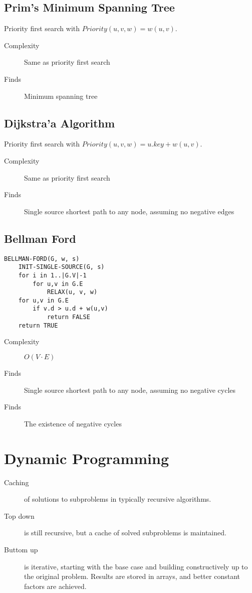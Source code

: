 \documentclass[landscape]{cheat}
\begin{document}
\begin{multicols*}{3}
\subsection{Prim's Minimum Spanning Tree}
Priority first search with $Priority(u, v, w) = w(u, v)$.
\begin{description}
    \item[Complexity] Same as priority first search
    \item[Finds] Minimum spanning tree
\end{description}

\subsection{Dijkstra'a Algorithm}
Priority first search with $Priority(u, v, w) = u.key + w(u, v)$.
\begin{description}
    \item[Complexity] Same as priority first search
    \item[Finds] Single source shortest path to any node, assuming no negative edges
\end{description}

\subsection{Bellman Ford}
\begin{lstlisting}
BELLMAN-FORD(G, w, s)
    INIT-SINGLE-SOURCE(G, s)
    for i in 1..|G.V|-1
        for u,v in G.E
            RELAX(u, v, w)
    for u,v in G.E
        if v.d > u.d + w(u,v)
            return FALSE
    return TRUE
\end{lstlisting}
\begin{description}
    \item[Complexity] $O(V\cdot E)$
    \item[Finds] Single source shortest path to any node, assuming no negative cycles
    \item[Finds] The existence of negative cycles
\end{description}

\section{Dynamic Programming}
\begin{description}
    \item[Caching] of solutions to subproblems in typically recursive algorithms.
    \item[Top down] is still recursive, but a cache of solved subproblems is maintained.
    \item[Buttom up] is iterative, starting with the base case and building constructively up to the original problem.
        Results are stored in arrays, and better constant factors are achieved.
\end{description}


\end{multicols*}
\end{document}
